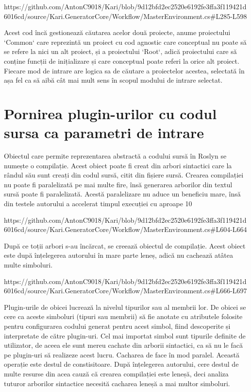 \documentclass{report}
\begin{document}
https://github.com/AntonC9018/Kari/blob/9d12bfd2ec2520e6192fe3ffa3f119421d6016cd/source/Kari.GeneratorCore/Workflow/MasterEnvironment.cs#L285-L598

Acest cod încă gestionează căutarea acelor două proiecte, anume proiectului `Common` care reprezintă un proiect cu cod agnostic care conceptual nu poate să se refere la nici un alt proiect, și a proiectului `Root`, adică proiectului care să conține funcții de inițializare și care conceptual poate referi la orice alt proiect.
Fiecare mod de intrare are logica sa de căutare a proiectelor acestea, selectată în așa fel ca să aibă cât mai mult sens în scopul modului de intrare selectat.

\section{Pornirea plugin-urilor cu codul sursa ca parametri de intrare}

Obiectul care permite reprezentarea abstractă a codului sursă în Roslyn se numește o compilație.
Acest obiect poate fi creat din arbori sintactici care la rândul său sunt creați din codul sursă, citit din fișiere sursă.
Crearea compilației nu poate fi paralelizată pe mai multe fire, însă generarea arborilor din textul sursă poate fi paralelizată.
Acestă paralelizare nu aduce un beneficiu mare, însă din testele autorului a accelerat timpul execuției cu aproape 10%

https://github.com/AntonC9018/Kari/blob/9d12bfd2ec2520e6192fe3ffa3f119421d6016cd/source/Kari.GeneratorCore/Workflow/MasterEnvironment.cs#L604-L664

După ce toții arbori s-au încărcat, se creează obiectul de compilație.
Acest obiect este după înțelegerea autorului în mare parte leneș, adică nu cachează atâtea multe simboluri.

https://github.com/AntonC9018/Kari/blob/9d12bfd2ec2520e6192fe3ffa3f119421d6016cd/source/Kari.GeneratorCore/Workflow/MasterEnvironment.cs#L666-L697

Plugin-urile de obicei lucrează la nivelul tipurilor sau al membrii lor.
De obicei se cere ca aceste simboluri (tipuri sau membrii) să fie anotate cu atributele folosite pentru configurarea codului generat pentru acest simbol, fiind descoperite și interpretate de către plugin-uri.
Cel mai importat simbol sunt tipurile definite de utilizator, de aceea ele sunt mereu cachate din arborii sintactici, ca să nu le facă pe plugin-uri să realizeze acest lucru.
Cacharea de face în mod paralel.
Această operație este destul de constisitoare.
După înțelegerea autorului, cere destul de multe resurse din acea cauză că crearea compilației este leneșă, deci analiza tuturor arborilor sintactice necesită cacharea leneșă a mai multor simboluri.
\end{document}
